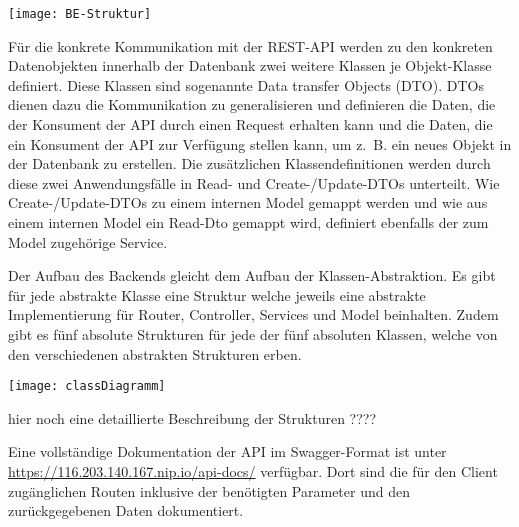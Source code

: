 \vspace{20pt}
\begin{center}
    \begin{minipage}{1\linewidth}
        \texttt{[image: BE-Struktur]}
    \end{minipage}
\end{center}
\vspace{20pt}

Für die konkrete Kommunikation mit der REST-API werden zu den konkreten Datenobjekten innerhalb der Datenbank zwei weitere Klassen je Objekt-Klasse definiert. Diese Klassen sind sogenannte Data transfer Objects (DTO). DTOs dienen dazu die Kommunikation zu generalisieren und definieren die Daten, die der Konsument der API durch einen Request erhalten kann und die Daten, die ein Konsument der API zur Verfügung stellen kann, um z. B. ein neues Objekt in der Datenbank zu erstellen. Die zusätzlichen Klassendefinitionen werden durch diese zwei Anwendungsfälle in Read- und Create-/Update-DTOs unterteilt. Wie Create-/Update-DTOs zu einem internen Model gemappt werden und wie aus einem internen Model ein Read-Dto gemappt wird, definiert ebenfalls der zum Model zugehörige Service.

Der Aufbau des Backends gleicht dem Aufbau der Klassen-Abstraktion. Es gibt für jede abstrakte Klasse eine Struktur welche jeweils eine abstrakte Implementierung für Router, Controller, Services und Model beinhalten.
Zudem gibt es fünf absolute Strukturen für jede der fünf absoluten Klassen, welche von den verschiedenen abstrakten Strukturen erben.


\vspace{20pt}
\begin{center}
    \begin{minipage}{1\linewidth}
        \texttt{[image: classDiagramm]}
    \end{minipage}
\end{center}
\vspace{20pt}

hier noch eine detaillierte Beschreibung der Strukturen ????

Eine vollständige Dokumentation der API im Swagger-Format ist unter \url{https://116.203.140.167.nip.io/api-docs/} verfügbar. Dort sind die für den Client zugänglichen Routen inklusive der benötigten Parameter und den zurückgegebenen Daten dokumentiert.

